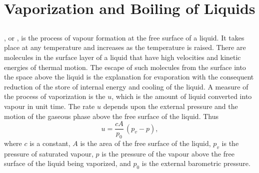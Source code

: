 \section{Vaporization and Boiling of Liquids}
\label{sec-13.6}

\subsection{}\label{13.6.1} , or , is the process of vapour formation at the free surface of a liquid. It takes place at any temperature and increases as the temperature is raised. There are molecules in the surface layer of a liquid that have high velocities and kinetic energies of thermal motion. The escape of such molecules from the surface into the space above the liquid is the explanation for evaporation with the consequent reduction of the store of internal energy and cooling of the liquid. A measure of the process of vaporization is the  $u$, which is the amount of liquid converted into vapour in unit time. The rate $u$ depends upon the external pressure and the motion of the gaseous phase above the free surface of the liquid. Thus
\begin{equation*}%
u = \frac{cA}{p_{0}} \, (p_{v} - p),
\end{equation*}
where $c$ is a constant, $A$ is the area of the free surface of the liquid, $p_{v}$ is the pressure of saturated vapour, $p$ is the pressure of the vapour above the free surface of the liquid being vaporized, and $p_{0}$ is the external barometric pressure.


